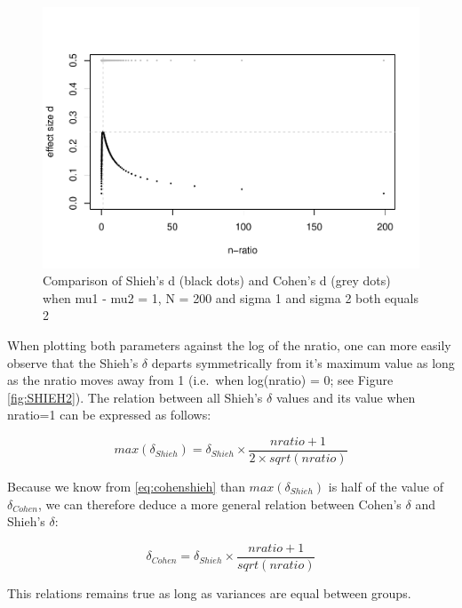\documentclass[man,floatsintext]{apa6}
\begin{document}
\begin{figure}
\centering
\includegraphics{The-shieh-s-and-its-relation-with-Cohen-s-d_files/figure-latex/SHIEH1-1.pdf}
\caption{\label{fig:SHIEH1}Comparison of Shieh's d (black dots) and Cohen's d (grey dots) when mu1 - mu2 = 1, N = 200 and sigma 1 and sigma 2 both equals 2}
\end{figure}

When plotting both parameters against the log of the nratio, one can more easily observe that the Shieh's \(\delta\) departs symmetrically from it's maximum value as long as the nratio moves away from 1 (i.e.~when log(nratio) = 0; see Figure \ref{fig:SHIEH2}). The relation between all Shieh's \(\delta\) values and its value when nratio=1 can be expressed as follows:

\begin{equation} 
max(\delta_{Shieh})= \delta_{Shieh} \times \frac{nratio+1}{2 \times sqrt(nratio)}
\label{eq:shiehvsmax}
\end{equation}

Because we know from \eqref{eq:cohenshieh} than \(max(\delta_{Shieh})\) is half of the value of \(\delta_{Cohen}\), we can therefore deduce a more general relation between Cohen's \(\delta\) and Shieh's \(\delta\):

\begin{equation} 
\delta_{Cohen}= \delta_{Shieh} \times \frac{nratio+1}{sqrt(nratio)}
\label{eq:cohenshiehgen}
\end{equation}

This relations remains true as long as variances are equal between groups.
\end{document}

